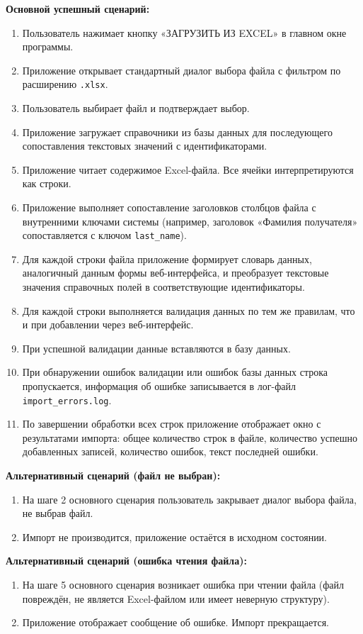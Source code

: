 \textbf{Основной успешный сценарий:}
\begin{enumerate}
	\item Пользователь нажимает кнопку «ЗАГРУЗИТЬ ИЗ EXCEL» в главном окне программы.
	\item Приложение открывает стандартный диалог выбора файла с фильтром по расширению \texttt{.xlsx}.
	\item Пользователь выбирает файл и подтверждает выбор.
	\item Приложение загружает справочники из базы данных для последующего сопоставления текстовых значений с идентификаторами.
	\item Приложение читает содержимое Excel-файла. Все ячейки интерпретируются как строки.
	\item Приложение выполняет сопоставление заголовков столбцов файла с внутренними ключами системы (например, заголовок «Фамилия получателя» сопоставляется с ключом \texttt{last\_name}).
	\item Для каждой строки файла приложение формирует словарь данных, аналогичный данным формы веб-интерфейса, и преобразует текстовые значения справочных полей в соответствующие идентификаторы.
	\item Для каждой строки выполняется валидация данных по тем же правилам, что и при добавлении через веб-интерфейс.
	\item При успешной валидации данные вставляются в базу данных.
	\item При обнаружении ошибок валидации или ошибок базы данных строка пропускается, информация об ошибке записывается в лог-файл \texttt{import\_errors.log}.
	\item По завершении обработки всех строк приложение отображает окно с результатами импорта: общее количество строк в файле, количество успешно добавленных записей, количество ошибок, текст последней ошибки.
\end{enumerate}

\textbf{Альтернативный сценарий (файл не выбран):}
\begin{enumerate}
	\item На шаге 2 основного сценария пользователь закрывает диалог выбора файла, не выбрав файл.
	\item Импорт не производится, приложение остаётся в исходном состоянии.
\end{enumerate}

\textbf{Альтернативный сценарий (ошибка чтения файла):}
\begin{enumerate}
	\item На шаге 5 основного сценария возникает ошибка при чтении файла (файл повреждён, не является Excel-файлом или имеет неверную структуру).
	\item Приложение отображает сообщение об ошибке. Импорт прекращается.
\end{enumerate}

